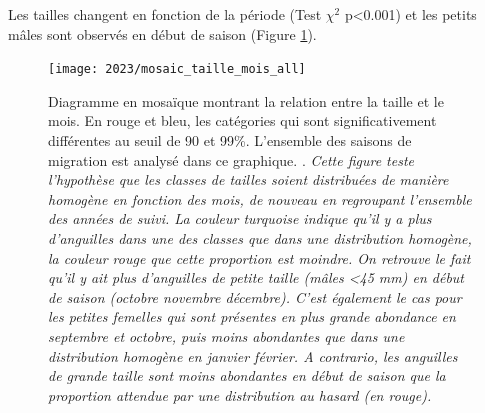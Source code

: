 \documentclass[11pt,twocolumn,titlepage,twoside]{article}
\newlength\defaultparindent
\begin{document}
Les tailles changent en fonction de la période (Test $\chi^2$ p<0.001) et les
petits mâles sont observés en début de saison (Figure
\ref{mosaic_taille_mois}).

\begin{figure}[htbp]
  \centering
  \texttt{[image: 2023/mosaic\_taille\_mois\_all]}
  \caption[Taille des anguilles]{Diagramme en mosaïque montrant la relation
  entre la taille et le mois. En rouge et bleu, les catégories qui sont
  significativement différentes au seuil de 90 et 99\%. L'ensemble des saisons
  de migration est analysé dans ce graphique.
  \citep{zeileis_ResidualbasedShadingsVisualizing_2007}.
 \textit{Cette figure teste l'hypothèse que les classes de tailles soient
distribuées de manière homogène en fonction des mois, de nouveau en regroupant l'ensemble des années de suivi.
La couleur turquoise indique qu'il y a plus d'anguilles dans une des classes que
dans une distribution homogène, la couleur rouge que cette proportion est
moindre.
On retrouve le fait qu'il y ait plus d'anguilles de petite taille (mâles <45 mm) en début de
saison (octobre novembre décembre). C'est
également le cas pour les petites femelles qui sont présentes en plus grande
abondance en septembre et octobre, puis moins abondantes que dans une
distribution homogène en janvier février. A contrario, les anguilles de
grande taille sont moins abondantes en début de saison que la proportion
attendue par une distribution au hasard (en rouge).}}
  \label{mosaic_taille_mois}
\end{figure}

\vspace{\dimexpr.8pt+\fboxsep\relax}
\noindent       
{}
\vspace{\dimexpr.8pt+\fboxsep\relax}
\end{document}
